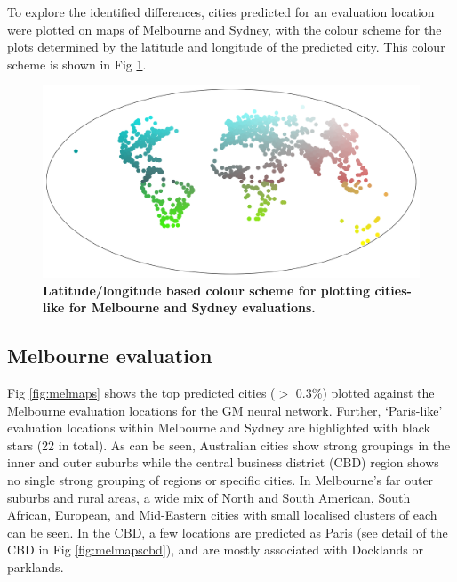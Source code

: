 \documentclass[Crown,sageh,times]{sagej}
\begin{document}
To explore the identified differences, cities predicted for an evaluation location were plotted on maps of Melbourne and Sydney, with the colour scheme for the plots determined by the latitude and longitude of the predicted city. This colour scheme is shown in Fig \ref{fig:colorscheme}. 



\begin{figure}[!htbp]
\centering    
\includegraphics[scale=0.25]{Images/PlosOne/Fig5.png} 
\caption{\bf Latitude/longitude based colour scheme for plotting cities-like for Melbourne and Sydney evaluations.}    
 \label{fig:colorscheme}  
\end{figure} 



\subsection{Melbourne evaluation} 

Fig \ref{fig:melmaps} shows the top predicted cities ($>$ 0.3\%) plotted against the Melbourne evaluation locations for the GM neural network. Further, `Paris-like' evaluation locations within Melbourne and Sydney are highlighted with black stars (22 in total). As can be seen, Australian cities show strong groupings in the inner and outer suburbs while the central business district (CBD) region shows no single strong grouping of regions or specific cities. In Melbourne's far outer suburbs and rural areas, a wide mix of North and South American, South African, European, and Mid-Eastern cities with small localised clusters of each can be seen. In the CBD, a few locations are predicted as Paris (see detail of the CBD in Fig \ref{fig:melmapscbd}), and are mostly associated with Docklands or parklands.
\end{document}
